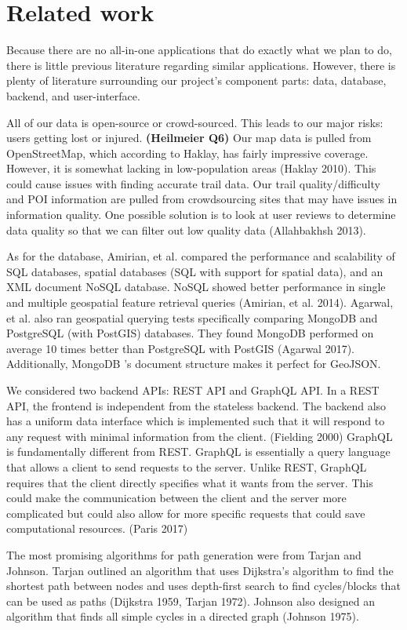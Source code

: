 \documentclass[sigconf]{acmart}
\begin{document}
\section{Related work}
Because there are no all-in-one applications that do exactly what we plan to do, there is little previous literature regarding similar applications. However, there is plenty of literature surrounding our project's component parts: data, database, backend, and user-interface.

All of our data is open-source or crowd-sourced. This leads to our major risks: users getting lost or injured. \textbf{(Heilmeier Q6)} Our map data is pulled from OpenStreetMap, which according to Haklay, has fairly impressive coverage. However, it is somewhat lacking in low-population areas (Haklay 2010). This could cause issues with finding accurate trail data. Our trail quality/difficulty and POI information are pulled from crowdsourcing sites that may have issues in information quality. One possible solution is to look at user reviews to determine data quality so that we can filter out low quality data (Allahbakhsh 2013).

As for the database, Amirian, et al. compared the performance and scalability of SQL databases, spatial databases (SQL with support for spatial data), and an XML document NoSQL database. NoSQL showed better performance in single and multiple geospatial feature retrieval queries (Amirian, et al. 2014). Agarwal, et al. also ran geospatial querying tests specifically comparing MongoDB and PostgreSQL (with PostGIS) databases. They found MongoDB performed on average 10 times better than PostgreSQL with PostGIS (Agarwal 2017). Additionally, MongoDB 's document structure makes it perfect for GeoJSON.

We considered two backend APIs: REST API and GraphQL API. In a REST API, the frontend is independent from the stateless backend. The backend also has a uniform data interface which is implemented such that it will respond to any request with minimal information from the client. (Fielding 2000) GraphQL is fundamentally different from REST. GraphQL is essentially a query language that allows a client to send requests to the server. Unlike REST, GraphQL requires that the client directly specifies what it wants from the server. This could make the communication between the client and the server more complicated but could also allow for more specific requests that could save computational resources. (Paris 2017)

The most promising algorithms for path generation were from Tarjan and Johnson. Tarjan outlined an algorithm that uses Dijkstra's algorithm to find the shortest path between nodes and uses depth-first search to find cycles/blocks that can be used as paths (Dijkstra 1959, Tarjan 1972). Johnson also designed an algorithm that finds all simple cycles in a directed graph (Johnson 1975).
\end{document}
